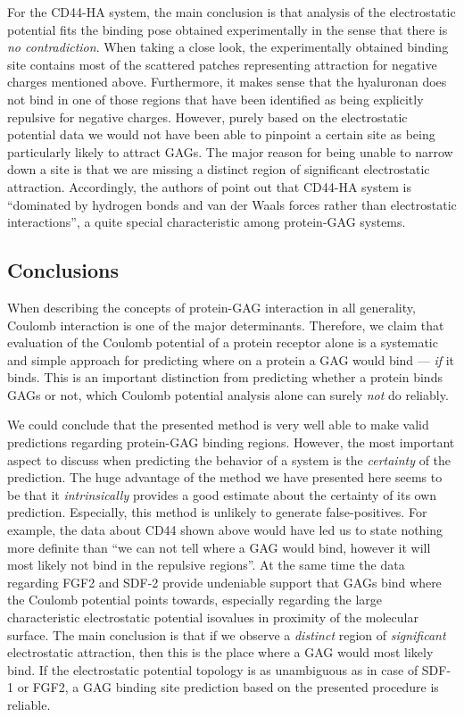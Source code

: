 For the CD44-HA system, the main conclusion is that analysis of the
electrostatic potential fits the binding pose obtained experimentally in the
sense that there is \textit{no contradiction}. When taking a close look, the
experimentally obtained binding site contains most of the scattered patches
representing attraction for negative charges mentioned above. Furthermore, it
makes sense that the hyaluronan does not bind in one of those regions that have
been identified as being explicitly repulsive for negative charges. However,
purely based on the electrostatic potential data we would not have been able to
pinpoint a certain site as being particularly likely to attract GAGs. The major
reason for being unable to narrow down a site is that we are missing a distinct
region of significant electrostatic attraction. Accordingly, the authors of
\cite{cd44_hya_2007} point out that CD44-HA system is  \enquote{dominated by
hydrogen bonds and van der Waals forces rather than electrostatic interactions},
a quite special characteristic among protein-GAG systems.



\subsection{Conclusions}

When describing the concepts of protein-GAG interaction in all generality,
Coulomb interaction is one of the major determinants. Therefore, we claim that
evaluation of the Coulomb potential of a protein receptor alone is a systematic
and simple approach for predicting where on a protein a GAG would bind ---
\textit{if} it binds. This is an important distinction from predicting whether a
protein binds GAGs or not, which Coulomb potential analysis alone can surely
\textit{not} do reliably.

We could conclude that the presented method is very well able to make valid
predictions regarding protein-GAG binding regions. However, the most important
aspect to discuss when predicting the behavior of a system is the
\textit{certainty} of the prediction. The huge advantage of the method we have
presented here seems to be that it \textit{intrinsically} provides a good
estimate about the certainty of its own prediction. Especially, this method is
unlikely to generate false-positives. For example, the data about CD44 shown
above would have led us to state nothing more definite than \enquote{we can not
tell where a GAG would bind, however it will most likely not bind in the
repulsive regions}. At the same time the data regarding FGF2 and SDF-2 provide
undeniable support that GAGs bind where the Coulomb potential points towards,
especially regarding the large characteristic electrostatic potential isovalues
in proximity of the molecular surface. The main conclusion is that if we observe
a \textit{distinct} region of \textit{significant} electrostatic attraction,
then this is the place where a GAG would most likely bind. If the electrostatic
potential topology is as unambiguous as in case of SDF-1 or FGF2, a GAG binding
site prediction based on the presented procedure is reliable.

